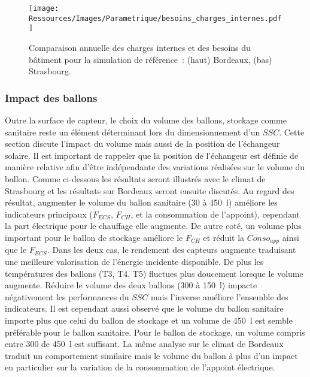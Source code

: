 \begin{figure}
    \begin{center}
        \texttt{[image: Ressources/Images/Parametrique/besoins\_charges\_internes.pdf]}
    \end{center}
    \caption{Comparaison annuelle des charges internes et des besoins du bâtiment
             pour la simulation de référence~: (haut) Bordeaux, (bas) Strasbourg.
             \label{fig:besoins_charges_internes}}
\end{figure}



\subsubsection{Impact des ballons} %
\label{ssub:impact_des_ballons}
Outre la surface de capteur, le choix du volume des ballons, stockage comme sanitaire
reste un élément déterminant lors du dimensionnement d’un $SSC$. Cette section discute
l’impact du volume mais aussi de la position de l’échangeur solaire. Il est important de
rappeler que la position de l’échangeur est définie de manière relative afin d’être
indépendante des variations réalisées sur le volume du ballon.
Comme ci-dessous les résultats seront illustrés avec le climat de Strasbourg et
les résultats sur Bordeaux seront ensuite discutés.
Au regard des résultat, augmenter le volume du ballon
sanitaire (\num{30} à \SI{450}{\litre}) améliore les indicateurs principaux ($F_{ECS}$, $F_{CH}$, et la consommation
de l’appoint), cependant la part électrique pour le chauffage elle augmente.
De autre coté, un volume plus important pour le ballon de stockage améliore le $F_{CH}$
et réduit la $Conso_{app}$ ainsi que le $F_{ECS}$. Dans les deux cas, le
rendement des capteurs augmente traduisant une meilleure valorisation de l’énergie incidente
disponible. De plus les températures des ballons (T3, T4, T5) fluctues plus doucement
lorsque le volume augmente.
Réduire le volume des deux ballons (\num{300} à \SI{150}{\litre}) impacte négativement
les performances du $SSC$ mais l’inverse améliore l’ensemble des indicateurs.
Il est cependant aussi observé que le volume du ballon sanitaire importe plus que
celui du ballon de stockage et un volume de \SI{450}{\litre} est semble préférable
pour le ballon sanitaire. Pour le ballon de stockage, un volume compris entre \num{300}
de \SI{450}{\litre} est suffisant.
La même analyse sur le climat de Bordeaux traduit un comportement similaire mais
le volume du ballon à plus d’un impact en particulier sur la variation de la consommation
de l’appoint électrique.

